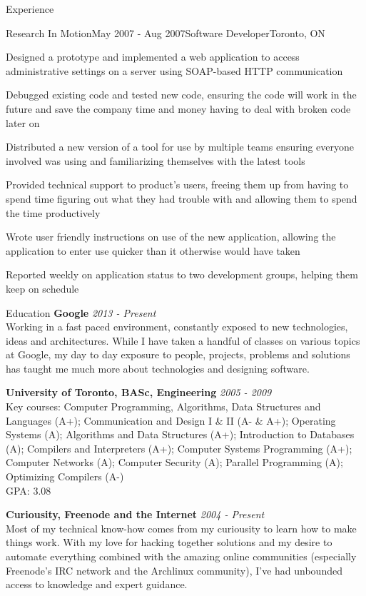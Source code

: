 \documentclass{resume}
\begin{document}
\begin{rSection}{Experience}
    \begin{rSubsection}{Research In Motion}{May 2007 - Aug 2007}{Software Developer}{Toronto, ON}
      \item Designed a prototype and implemented a web application to access administrative settings on a server using SOAP-based HTTP communication
      \item Debugged existing code and tested new code, ensuring the code will work in the future and save the company time and money having to deal with broken code later on
      \item Distributed a new version of a tool for use by multiple teams ensuring everyone involved was using and familiarizing themselves with the latest tools
      \item Provided technical support to product’s users, freeing them up from having to spend time figuring out what they had trouble with and allowing them to spend the time productively
      \item Wrote user friendly instructions on use of the new application, allowing the application to enter use quicker than it otherwise would have taken 
      \item Reported weekly on application status to two development groups, helping them keep on schedule
    \end{rSubsection}

  \end{rSection}

  \begin{rSection}{Education}
    {\bf Google} \hfill {\em 2013 - Present} \\
    { Working in a fast paced environment, constantly exposed to new technologies, ideas and architectures. While I have taken a handful of classes on various topics at Google, my day to day exposure to people, projects, problems and solutions has taught me much more about technologies and designing software. }

    {\bf University of Toronto, BASc, Engineering} \hfill {\em 2005 - 2009} \\
    { \small Key courses: Computer Programming, Algorithms, Data Structures and Languages (A+); Communication and Design I \& II (A- \& A+); Operating Systems (A); Algorithms and Data Structures (A+); Introduction to Databases (A); Compilers and Interpreters (A+); Computer Systems Programming (A+); Computer Networks (A); Computer Security (A); Parallel Programming (A); Optimizing Compilers (A-) } \\
    { GPA: 3.08 }

    {\bf Curiousity, Freenode and the Internet} \hfill {\em 2004 - Present} \\
    { Most of my technical know-how comes from my curiousity to learn how to make things work. With my love for hacking together solutions and my desire to automate everything combined with the amazing online communities (especially Freenode's IRC network and the Archlinux community), I've had unbounded access to knowledge and expert guidance.}

  \end{rSection}
\end{document}
